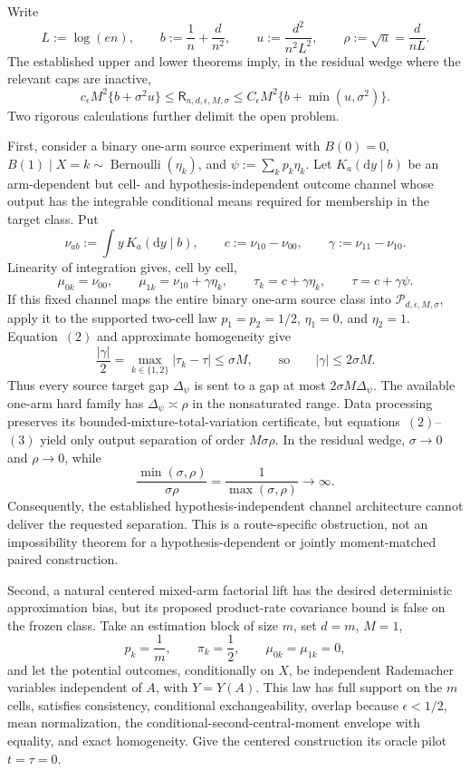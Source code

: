 Write
\[
 L:=\log(en),\qquad b:=\frac1n+\frac d{n^2},\qquad
 u:=\frac{d^2}{n^2L^2},\qquad \rho:=\sqrt u=\frac d{nL}.
\]
The established upper and lower theorems imply, in the residual wedge where the relevant caps are inactive,
\[
 c_{\epsilon}M^2\{b+\sigma^2u\}
 \le \mathsf R_{n,d,\epsilon,M,\sigma}
 \le C_{\epsilon}M^2\{b+\min(u,\sigma^2)\}.
\tag{1}
\]
Two rigorous calculations further delimit the open problem.

First, consider a binary one-arm source experiment with \(B(0)=0\), \(B(1)\mid X=k\sim\operatorname{Bernoulli}(\eta_k)\), and \(\psi:=\sum_kp_k\eta_k\).  Let \(K_a(\mathrm dy\mid b)\) be an arm-dependent but cell- and hypothesis-independent outcome channel whose output has the integrable conditional means required for membership in the target class.  Put
\[
 \nu_{ab}:=\int y\,K_a(\mathrm dy\mid b),\qquad
 c:=\nu_{10}-\nu_{00},\qquad \gamma:=\nu_{11}-\nu_{10}.
\]
Linearity of integration gives, cell by cell,
\[
 \mu_{0k}=\nu_{00},\qquad
 \mu_{1k}=\nu_{10}+\gamma\eta_k,\qquad
 \tau_k=c+\gamma\eta_k,\qquad
 \tau=c+\gamma\psi.
\tag{2}
\]
If this fixed channel maps the entire binary one-arm source class into \(\mathcal P_{d,\epsilon,M,\sigma}\), apply it to the supported two-cell law \(p_1=p_2=1/2\), \(\eta_1=0\), and \(\eta_2=1\).  Equation~\((2)\) and approximate homogeneity give
\[
 \frac{|\gamma|}{2}
 =\max_{k\in\{1,2\}}|\tau_k-\tau|
 \le \sigma M,
 \qquad\text{so}\qquad |\gamma|\le2\sigma M.
\tag{3}
\]
Thus every source target gap \(\Delta_{\psi}\) is sent to a gap at most \(2\sigma M\Delta_{\psi}\).  The available one-arm hard family has \(\Delta_{\psi}\asymp\rho\) in the nonsaturated range.  Data processing preserves its bounded-mixture-total-variation certificate, but equations~\((2)\)--\((3)\) yield only output separation of order \(M\sigma\rho\).  In the residual wedge, \(\sigma\to0\) and \(\rho\to0\), while
\[
 \frac{\min(\sigma,\rho)}{\sigma\rho}
 =\frac1{\max(\sigma,\rho)}\longrightarrow\infty.
\tag{4}
\]
Consequently, the established hypothesis-independent channel architecture cannot deliver the requested separation.  This is a route-specific obstruction, not an impossibility theorem for a hypothesis-dependent or jointly moment-matched paired construction.

Second, a natural centered mixed-arm factorial lift has the desired deterministic approximation bias, but its proposed product-rate covariance bound is false on the frozen class.  Take an estimation block of size \(m\), set \(d=m\), \(M=1\),
\[
 p_k=\frac1m,\qquad \pi_k=\frac12,\qquad
 \mu_{0k}=\mu_{1k}=0,
\]
and let the potential outcomes, conditionally on \(X\), be independent Rademacher variables independent of \(A\), with \(Y=Y(A)\).  This law has full support on the \(m\) cells, satisfies consistency, conditional exchangeability, overlap because \(\epsilon<1/2\), mean normalization, the conditional-second-central-moment envelope with equality, and exact homogeneity.  Give the centered construction its oracle pilot \(t=\tau=0\).

